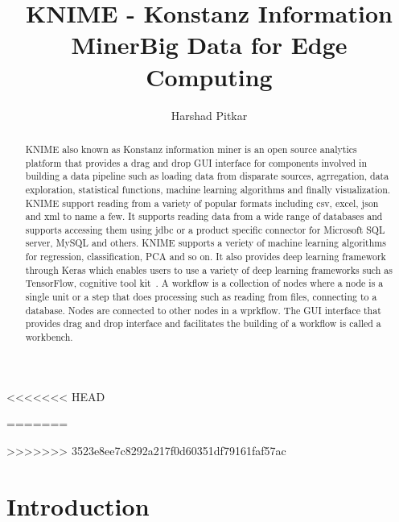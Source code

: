 <<<<<<< HEAD
\title{KNIME - Konstanz Information Miner}
=======

\title{Big Data for Edge Computing}
>>>>>>> 3523e8ee7c8292a217f0d60351df79161faf57ac


\author{Harshad Pitkar}



\renewcommand{\shortauthors}{Harshad Pitkar}


\begin{abstract}

KNIME also known as Konstanz information miner is an open source
analytics platform that provides a drag and drop GUI interface for
components involved in building a data pipeline such as loading data
from disparate sources, agrregation, data exploration, statistical
functions, machine learning algorithms and finally visualization.
KNIME support reading from a variety of popular formats including csv,
excel, json and xml to name a few. It supports reading data from a
wide range of databases and supports accessing them using jdbc or a
product specific connector for Microsoft SQL server, MySQL and others.
KNIME supports a veriety of machine learning algorithms for
regression, classification, PCA and so on. It also provides deep
learning framework through Keras which enables users to use a variety
of deep learning frameworks such as TensorFlow, cognitive tool
kit~\cite{hid-sp18-517-kdl}. A workflow is a collection of nodes where
a node is a single unit or a step that does processing such as reading
from files, connecting to a database. Nodes are connected to other
nodes in a wprkflow. The GUI interface that provides drag and drop
interface and facilitates the building of a workflow is called a
workbench.

\end{abstract}



\maketitle

\section{Introduction}

